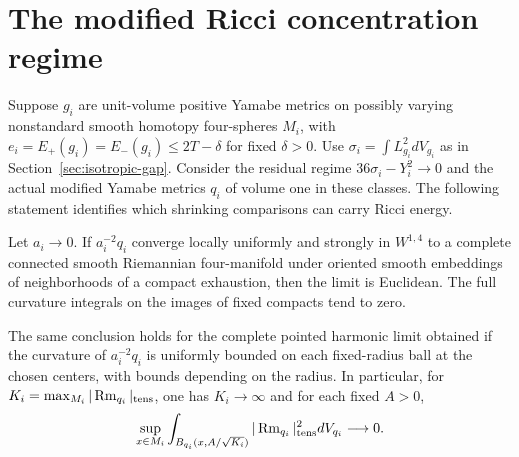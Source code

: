 \section{The modified Ricci concentration regime}\label{sec:modified-ricci-concentration}

Suppose \(g_i\) are unit-volume positive Yamabe metrics on possibly
varying nonstandard smooth homotopy four-spheres \(M_i\), with
\(e_i=E_+(g_i)=E_-(g_i)\le2T-\delta\) for fixed \(\delta>0\).
Use \(\sigma_i=\int L_{g_i}^2dV_{g_i}\) as in
Section~\ref{sec:isotropic-gap}. Consider the residual regime
\(36\sigma_i-Y_i^2\to0\) and the actual modified Yamabe metrics
\(q_i\) of volume one in these classes. The following statement
identifies which shrinking comparisons can carry Ricci energy.

\begin{theorem}\label{thm:modified-shrinking-limits}
Let \(a_i\to0\). If \(a_i^{-2}q_i\) converge locally uniformly and
strongly in \(W^{1,4}\) to a complete connected smooth Riemannian
four-manifold under oriented smooth embeddings of neighborhoods
of a compact exhaustion, then the limit is Euclidean. The full
curvature integrals on the images of fixed compacts tend to zero.

The same conclusion holds for the complete pointed harmonic
limit obtained if the curvature of \(a_i^{-2}q_i\) is uniformly
bounded on each fixed-radius ball at the chosen centers, with
bounds depending on the radius. In particular, for
\(K_i=\max_{M_i}|\operatorname{Rm}_{q_i}|_{\rm tens}\), one has \(K_i\to\infty\)
and for each fixed \(A>0\),
\begin{equation}\label{eq:modified-peak-energy}
 \sup_{x\in M_i}\int_{B_{q_i}(x,A/\sqrt{K_i})}
              |\operatorname{Rm}_{q_i}|_{\rm tens}^2dV_{q_i}\longrightarrow0.
\end{equation}
\end{theorem}

